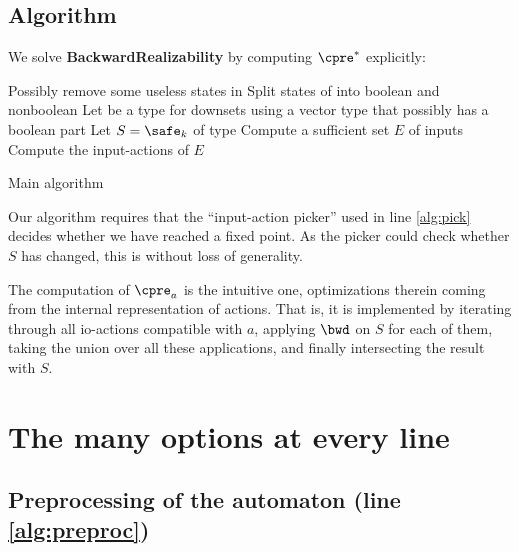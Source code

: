 \documentclass[runningheads,a4paper]{llncs}
\begin{document}
\subsection{Algorithm}\label{sec:algo}

We
solve \textbf{BackwardRealizability} by computing
\(\cpre^*\) explicitly:

\begin{algorithm}
  \LinesNumbered
{}

\BlankLine

Possibly remove some useless states in \cA\;\label{alg:preproc}
Split states of \cA into boolean and nonboolean\;\label{alg:bool}
Let \Downset be a type for downsets using a vector type that possibly has a
boolean part\;\label{alg:types}
Let \(S = \safe_k\) of type \Downset\;
Compute a sufficient set \(E\) of  inputs\;\label{alg:inputs}
Compute the input-actions of \(E\)\;\label{alg:actions}
\caption{Main algorithm}\label{main_algo}
\end{algorithm}

Our algorithm requires that the ``input-action picker'' used in line \ref{alg:pick}
decides whether we have reached a fixed point.  As the picker could check
whether \(S\) has changed, this is without loss of generality.

The computation of \(\cpre_a\) is the intuitive one, optimizations therein coming
from the internal representation of actions.  That is, it is implemented by
iterating through all io-actions compatible with \(a\), applying \(\bwd\) on
\(S\) for each of them, taking the union over all these applications, and finally
intersecting the result with \(S\).

\section{The many options at every line}\label{sec:implem}

\subsection{Preprocessing of the automaton (line \ref{alg:preproc})}\label{sec:preproc}
\end{document}

